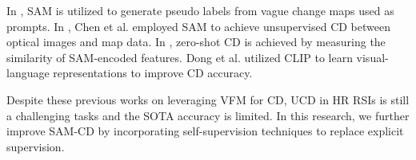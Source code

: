 In \cite{wang2023cs}, SAM is utilized to generate pseudo labels from vague change maps used as prompts. In \cite{chen2024change}, Chen et al. employed SAM to achieve unsupervised CD between optical images and map data. In \cite{zheng2024segment}, zero-shot CD is achieved by measuring the similarity of SAM-encoded features. Dong et al. \cite{dong2024changeclip} utilized CLIP to learn visual-language representations to improve CD accuracy.

Despite these previous works on leveraging VFM for CD, UCD in HR RSIs is still a challenging tasks and the SOTA accuracy is limited. In this research, we further improve SAM-CD by incorporating self-supervision techniques to replace explicit supervision.
